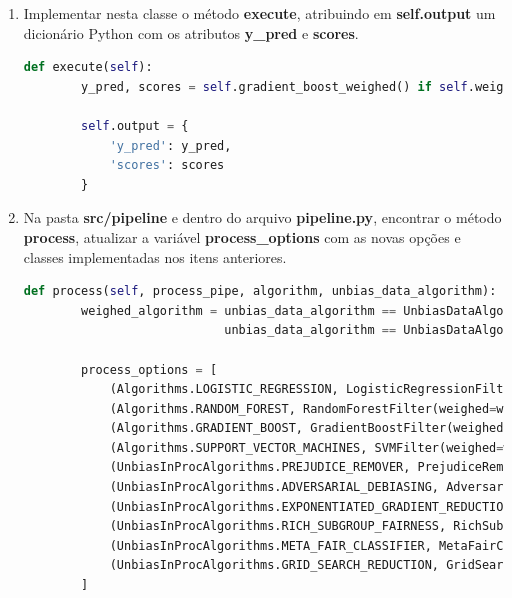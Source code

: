 \documentclass[portugues]{ic-tese}
\begin{document}
\begin{enumerate}
\begin{lstlisting}[language=Python, label=cod:BaseFilter]
class GradientBoostFilter(BaseFilter):
    weighed = False

    def __init__(self, weighed=False):
        self.weighed = weighed
\end{lstlisting}

\item Implementar nesta classe o método \textbf{execute}, atribuindo em \textbf{self.output} um dicionário Python com os atributos \textbf{y\_pred} e \textbf{scores}.

\begin{lstlisting}[language=Python, label=cod:FilterExecute]
    def execute(self):
        y_pred, scores = self.gradient_boost_weighed() if self.weighed else self.gradient_boost()

        self.output = {
            'y_pred': y_pred,
            'scores': scores
        }
\end{lstlisting}

\item Na pasta \textbf{src/pipeline} e dentro do arquivo \textbf{pipeline.py}, encontrar o método \textbf{process}, atualizar a variável \textbf{process\_options} com as novas opções e classes implementadas nos itens anteriores.

\begin{lstlisting}[language=Python, label=cod:ProcessAlgorithm]
    def process(self, process_pipe, algorithm, unbias_data_algorithm):
        weighed_algorithm = unbias_data_algorithm == UnbiasDataAlgorithms.REWEIGHING or \
                            unbias_data_algorithm == UnbiasDataAlgorithms.LEARNING_FAIR_REPRESENTATIONS

        process_options = [
            (Algorithms.LOGISTIC_REGRESSION, LogisticRegressionFilter(weighed=weighed_algorithm)),
            (Algorithms.RANDOM_FOREST, RandomForestFilter(weighed=weighed_algorithm)),
            (Algorithms.GRADIENT_BOOST, GradientBoostFilter(weighed=weighed_algorithm)),
            (Algorithms.SUPPORT_VECTOR_MACHINES, SVMFilter(weighed=weighed_algorithm)),
            (UnbiasInProcAlgorithms.PREJUDICE_REMOVER, PrejudiceRemoverFilter()),
            (UnbiasInProcAlgorithms.ADVERSARIAL_DEBIASING, AdversarialDebiasingFilter()),
            (UnbiasInProcAlgorithms.EXPONENTIATED_GRADIENT_REDUCTION, ExponentiatedGradientReductionFilter(algorithm=Algorithms.GRADIENT_BOOST)),
            (UnbiasInProcAlgorithms.RICH_SUBGROUP_FAIRNESS, RichSubgroupFairnessFilter(algorithm=Algorithms.DECISION_TREE)),
            (UnbiasInProcAlgorithms.META_FAIR_CLASSIFIER, MetaFairClassifierFilter()),
            (UnbiasInProcAlgorithms.GRID_SEARCH_REDUCTION, GridSearchReductionFilter(algorithm=Algorithms.RANDOM_FOREST))
        ]


\end{lstlisting}
\end{enumerate}
\end{document}
